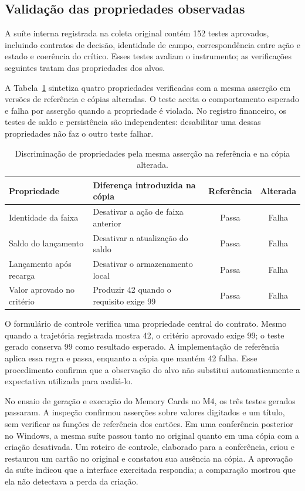 \documentclass[12pt]{article}
\begin{document}
\subsection{Validação das propriedades observadas}
A suíte interna registrada na coleta original contém 152 testes aprovados, incluindo contratos de decisão, identidade de campo, correspondência entre ação e estado e coerência do crítico. Esses testes avaliam o instrumento; as verificações seguintes tratam das propriedades dos alvos.

A Tabela~\ref{tab:regression} sintetiza quatro propriedades verificadas com a mesma asserção em versões de referência e cópias alteradas. O teste aceita o comportamento esperado e falha por asserção quando a propriedade é violada. No registro financeiro, os testes de saldo e persistência são independentes: desabilitar uma dessas propriedades não faz o outro teste falhar.

\begin{table}[ht]
\centering
\caption{Discriminação de propriedades pela mesma asserção na referência e na cópia alterada.}
\label{tab:regression}
\small
\begin{tabular}{>{\raggedright\arraybackslash}p{4.2cm}>{\raggedright\arraybackslash}p{5.7cm}cc}
\toprule
Propriedade & Diferença introduzida na cópia & Referência & Alterada\\
\midrule
Identidade da faixa & Desativar a ação de faixa anterior & Passa & Falha\\
Saldo do lançamento & Desativar a atualização do saldo & Passa & Falha\\
Lançamento após recarga & Desativar o armazenamento local & Passa & Falha\\
Valor aprovado no critério & Produzir 42 quando o requisito exige 99 & Passa & Falha\\
\bottomrule
\end{tabular}
\end{table}

O formulário de controle verifica uma propriedade central do contrato. Mesmo quando a trajetória registrada mostra 42, o critério aprovado exige 99; o teste gerado conserva 99 como resultado esperado. A implementação de referência aplica essa regra e passa, enquanto a cópia que mantém 42 falha. Esse procedimento confirma que a observação do alvo não substitui automaticamente a expectativa utilizada para avaliá-lo.

No ensaio de geração e execução do Memory Cards no M4, os três testes gerados passaram. A inspeção confirmou asserções sobre valores digitados e um título, sem verificar as funções de referência dos cartões. Em uma conferência posterior no Windows, a mesma suíte passou tanto no original quanto em uma cópia com a criação desativada. Um roteiro de controle, elaborado para a conferência, criou e restaurou um cartão no original e constatou sua ausência na cópia. A aprovação da suíte indicou que a interface exercitada respondia; a comparação mostrou que ela não detectava a perda da criação.
\end{document}
